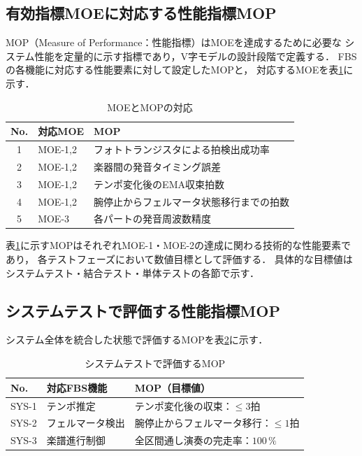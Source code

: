\subsection{有効指標MOEに対応する性能指標MOP}

MOP（Measure of Performance：性能指標）はMOEを達成するために必要な
システム性能を定量的に示す指標であり，V字モデルの設計段階で定義する．
FBSの各機能に対応する性能要素に対して設定したMOPと，
対応するMOEを表\ref{tab:moe-mop}に示す．

\begin{table}[H]
  \centering
  \caption{MOEとMOPの対応}
  \label{tab:moe-mop}
  \begin{tabularx}{\linewidth}{clX}
    \toprule
    No. & 対応MOE & MOP \\
    \midrule
    1 & MOE-1,2 & フォトトランジスタによる拍検出成功率 \\
    2 & MOE-1,2 & 楽器間の発音タイミング誤差 \\
    3 & MOE-1,2 & テンポ変化後のEMA収束拍数 \\
    4 & MOE-1,2 & 腕停止からフェルマータ状態移行までの拍数 \\
    5 & MOE-3   & 各パートの発音周波数精度 \\
    \bottomrule
  \end{tabularx}
\end{table}

表\ref{tab:moe-mop}に示すMOPはそれぞれMOE-1・MOE-2の達成に関わる技術的な性能要素であり，
各テストフェーズにおいて数値目標として評価する．
具体的な目標値はシステムテスト・結合テスト・単体テストの各節で示す．

\subsection{システムテストで評価する性能指標MOP}

システム全体を統合した状態で評価するMOPを表\ref{tab:mop-sys}に示す．

\begin{table}[H]
  \centering
  \caption{システムテストで評価するMOP}
  \label{tab:mop-sys}
  \begin{tabularx}{\linewidth}{llX}
    \toprule
    No. & 対応FBS機能 & MOP（目標値） \\
    \midrule
    SYS-1 & テンポ推定 &
      テンポ変化後の収束：$\leq 3$拍 \\
    SYS-2 & フェルマータ検出 &
      腕停止からフェルマータ移行：$\leq 1$拍 \\
    SYS-3 & 楽譜進行制御 &
      全区間通し演奏の完走率：$100\,\%$ \\
    \bottomrule
  \end{tabularx}
\end{table}

